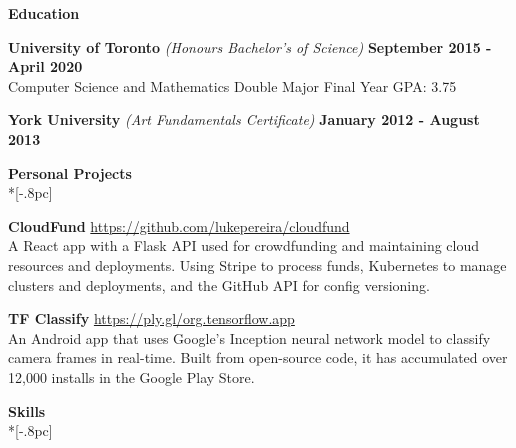 \documentclass{article}
\begin{document}
\vspace{4pt}
{\large \bf Education} \\[-.8pc]
\underline{\hspace{7in}} 

{\bf University of Toronto} {\textit{(Honours Bachelor's of Science)}} \hfill {\bf September 2015 - April 2020} \\[.2pc]
Computer Science and Mathematics Double Major  \hfill {Final Year GPA: 3.75}

{\bf York University} {\textit{(Art Fundamentals Certificate)}} \hfill {\bf January 2012 - August 2013 \/} 

\vspace{4pt}
{\large \bf Personal Projects} \\*[-.8pc]
\underline{\hspace{7in}}

\textbf{CloudFund} \hfill \url{https://github.com/lukepereira/cloudfund}\\
A React app with a Flask API used for crowdfunding and maintaining cloud resources and deployments. Using Stripe to process funds, Kubernetes to manage clusters and deployments, and the GitHub API for config versioning.

\textbf{TF Classify} \hfill \url{https://ply.gl/org.tensorflow.app}\\
An Android app that uses Google’s Inception neural network model to classify camera frames in real-time. Built from open-source code, it has accumulated over 12,000 installs in the Google Play Store.

\vspace{4pt}
{\large \bf Skills} \\*[-.8pc]
\underline{\hspace{7in}}
\end{document}
